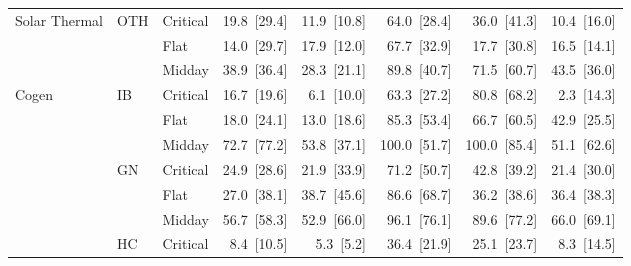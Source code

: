 \begin{tabular}{l l l r r r r r}
\addlinespace
Solar Thermal & OTH & Critical & 19.8~{\color{seasoncol}\scriptsize[29.4]} & 11.9~{\color{seasoncol}\scriptsize[10.8]} & 64.0~{\color{seasoncol}\scriptsize[28.4]} & 36.0~{\color{seasoncol}\scriptsize[41.3]} & 10.4~{\color{seasoncol}\scriptsize[16.0]} \\
 &  & Flat & 14.0~{\color{seasoncol}\scriptsize[29.7]} & 17.9~{\color{seasoncol}\scriptsize[12.0]} & 67.7~{\color{seasoncol}\scriptsize[32.9]} & 17.7~{\color{seasoncol}\scriptsize[30.8]} & 16.5~{\color{seasoncol}\scriptsize[14.1]} \\
 &  & Midday & 38.9~{\color{seasoncol}\scriptsize[36.4]} & 28.3~{\color{seasoncol}\scriptsize[21.1]} & 89.8~{\color{seasoncol}\scriptsize[40.7]} & 71.5~{\color{seasoncol}\scriptsize[60.7]} & 43.5~{\color{seasoncol}\scriptsize[36.0]} \\
\addlinespace
Cogen & IB & Critical & 16.7~{\color{seasoncol}\scriptsize[19.6]} & 6.1~{\color{seasoncol}\scriptsize[10.0]} & 63.3~{\color{seasoncol}\scriptsize[27.2]} & 80.8~{\color{seasoncol}\scriptsize[68.2]} & 2.3~{\color{seasoncol}\scriptsize[14.3]} \\
 &  & Flat & 18.0~{\color{seasoncol}\scriptsize[24.1]} & 13.0~{\color{seasoncol}\scriptsize[18.6]} & 85.3~{\color{seasoncol}\scriptsize[53.4]} & 66.7~{\color{seasoncol}\scriptsize[60.5]} & 42.9~{\color{seasoncol}\scriptsize[25.5]} \\
 &  & Midday & 72.7~{\color{seasoncol}\scriptsize[77.2]} & 53.8~{\color{seasoncol}\scriptsize[37.1]} & 100.0~{\color{seasoncol}\scriptsize[51.7]} & 100.0~{\color{seasoncol}\scriptsize[85.4]} & 51.1~{\color{seasoncol}\scriptsize[62.6]} \\
 & GN & Critical & 24.9~{\color{seasoncol}\scriptsize[28.6]} & 21.9~{\color{seasoncol}\scriptsize[33.9]} & 71.2~{\color{seasoncol}\scriptsize[50.7]} & 42.8~{\color{seasoncol}\scriptsize[39.2]} & 21.4~{\color{seasoncol}\scriptsize[30.0]} \\
 &  & Flat & 27.0~{\color{seasoncol}\scriptsize[38.1]} & 38.7~{\color{seasoncol}\scriptsize[45.6]} & 86.6~{\color{seasoncol}\scriptsize[68.7]} & 36.2~{\color{seasoncol}\scriptsize[38.6]} & 36.4~{\color{seasoncol}\scriptsize[38.3]} \\
 &  & Midday & 56.7~{\color{seasoncol}\scriptsize[58.3]} & 52.9~{\color{seasoncol}\scriptsize[66.0]} & 96.1~{\color{seasoncol}\scriptsize[76.1]} & 89.6~{\color{seasoncol}\scriptsize[77.2]} & 66.0~{\color{seasoncol}\scriptsize[69.1]} \\
 & HC & Critical & 8.4~{\color{seasoncol}\scriptsize[10.5]} & 5.3~{\color{seasoncol}\scriptsize[5.2]} & 36.4~{\color{seasoncol}\scriptsize[21.9]} & 25.1~{\color{seasoncol}\scriptsize[23.7]} & 8.3~{\color{seasoncol}\scriptsize[14.5]} \\

\end{tabular}
